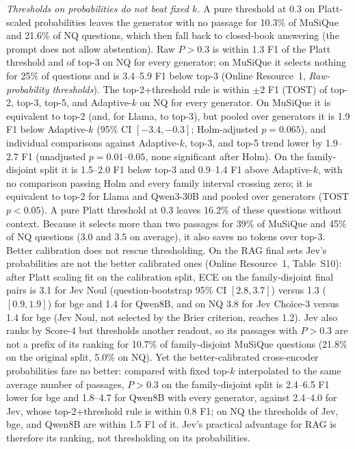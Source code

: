 \emph{Thresholds on probabilities do not beat fixed $k$.} A pure threshold at 0.3 on Platt-scaled probabilities leaves the generator with no passage for 10.3\% of MuSiQue and 21.6\% of NQ questions, which then fall back to closed-book answering (the prompt does not allow abstention). Raw $P>0.3$ is within 1.3 F1 of the Platt threshold and of top-3 on NQ for every generator; on MuSiQue it selects nothing for 25\% of questions and is 3.4--5.9 F1 below top-3 (Online Resource~1, \emph{Raw-probability thresholds}).
The top-2+threshold rule is within $\pm2$ F1 (TOST) of top-2, top-3, top-5, and Adaptive-$k$ on NQ for every generator. On MuSiQue it is equivalent to top-2 (and, for Llama, to top-3), but pooled over generators it is 1.9 F1 below Adaptive-$k$ (95\% CI $[-3.4,-0.3]$; Holm-adjusted $p=0.065$), and individual comparisons against Adaptive-$k$, top-3, and top-5 trend lower by 1.9--2.7 F1 (unadjusted $p=0.01$--$0.05$, none significant after Holm). On the family-disjoint split it is 1.5--2.0 F1 below top-3 and 0.9--1.4 F1 above Adaptive-$k$, with no comparison passing Holm and every family interval crossing zero; it is equivalent to top-2 for Llama and Qwen3-30B and pooled over generators (TOST $p<0.05$). A pure Platt threshold at 0.3 leaves 16.2\% of these questions without context. Because it selects more than two passages for 39\% of MuSiQue and 45\% of NQ questions (3.0 and 3.5 on average), it also saves no tokens over top-3.
Better calibration does not rescue thresholding. On the RAG final sets Jev's probabilities are not the better calibrated ones (Online Resource~1, Table~S10): after Platt scaling fit on the calibration split, ECE on the family-disjoint final pairs is 3.1 for Jev Noul (question-bootstrap 95\% CI $[2.8,3.7]$) versus 1.3 ($[0.9,1.9]$) for bge and 1.4 for Qwen8B, and on NQ 3.8 for Jev Choice-3 versus 1.4 for bge (Jev Noul, not selected by the Brier criterion, reaches 1.2). Jev also ranks by Score-4 but thresholds another readout, so its passages with $P>0.3$ are not a prefix of its ranking for 10.7\% of family-disjoint MuSiQue questions (21.8\% on the original split, 5.0\% on NQ). Yet the better-calibrated cross-encoder probabilities fare no better: compared with fixed top-$k$ interpolated to the same average number of passages, $P>0.3$ on the family-disjoint split is 2.4--6.5 F1 lower for bge and 1.8--4.7 for Qwen8B with every generator, against 2.4--4.0 for Jev, whose top-2+threshold rule is within 0.8 F1; on NQ the thresholds of Jev, bge, and Qwen8B are within 1.5 F1 of it.
Jev's practical advantage for RAG is therefore its ranking, not thresholding on its probabilities.
